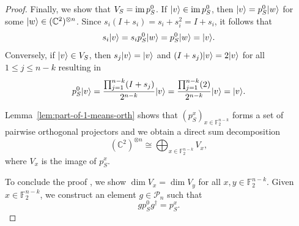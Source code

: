 \documentclass[a4paper, oneside, 12pt]{amsart}
\newcommand*{\PauliGroup}{\ensuremath{\mathcal{P}}}
\begin{document}
\begin{proof}
    Finally, we show that \(V_{S}= \operatorname{im} p^{0}_{S}\).
    If \(\lvert v\rangle \in \operatorname{im} p^0_S\), then \(\lvert v\rangle = p^0_S\lvert w\rangle\) for some \(\lvert w\rangle \in ( \mathbb{C}^{2})^{\otimes n}\).
    Since \(s_i(I + s_i) = s_i + s_i^2 = I + s_i\), it follows that
    \begin{equation*}
      s_i \lvert v\rangle = s_{i} p^0_S \lvert w\rangle = p^0_S \lvert w\rangle = \lvert v\rangle.
    \end{equation*}
    Conversely, if \(\lvert v\rangle \in V_S\), then \(s_j \lvert v\rangle = \lvert v\rangle\) and \((I+s_{j})\lvert v\rangle = 2\lvert v\rangle\) for all \(1 \leq j \leq n-k\) resulting in
    \begin{equation*}
      p^0_S \lvert v\rangle
      = \frac{\prod_{j=1}^{n-k} (I + s_j)}{2^{n-k}} \lvert v\rangle
      = \frac{\prod_{j=1}^{n-k} (2)}{2^{n-k}} \lvert v\rangle
      = \lvert v\rangle.
    \end{equation*}


    Lemma~\ref{lem:part-of-1-means-orth} shows that  \( (p^x_S)_{x \in \mathbb{F}_2^{n-k}} \) forms a set of pairwise orthogonal projectors and we obtain a direct sum decomposition
  \begin{equation*}
    (\mathbb{C}^2)^{\otimes n} \cong \bigoplus_{x \in \mathbb{F}_2^{n-k}} V_x,
  \end{equation*}
  where \( V_x \) is the image of \( p^x_S \).

  To conclude the proof , we show \( \dim V_x = \dim V_y \) for all \( x, y \in \mathbb{F}_2^{n-k}\).
  Given \( x \in \mathbb{F}_2^{n-k} \), we construct an element \( g \in \PauliGroup_n \) such that
  \begin{equation*}
    g p^0_S g^\dagger = p^x_S.
  \end{equation*}


\end{proof}
\end{document}
